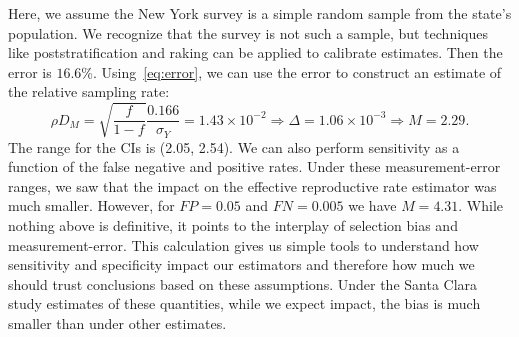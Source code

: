 \documentclass[aoas]{amsart}
\begin{document}
Here, we assume the New York survey is a simple random sample from the state's population. We recognize that the survey is not such a sample, but techniques like poststratification and raking can be applied to calibrate estimates. Then the error is $16.6$\%.  Using~\eqref{eq:error}, we can use the error to construct an estimate of the relative sampling rate:
\[
\rho D_M = \sqrt{\frac{f}{1-f}} \frac{\text{0.166}}{\sigma_Y} = 1.43 \times 10^{-2} \Rightarrow \Delta = 1.06 \times 10^{-3} \Rightarrow M = 2.29.
\]
The range for the CIs is (2.05, 2.54).  We can also perform sensitivity as a function of the false negative and positive rates.  Under these measurement-error ranges, we saw that the impact on the effective reproductive rate estimator was much smaller.  However, for $FP = 0.05$ and $FN = 0.005$ we have $M = 4.31$.  While nothing above is definitive, it points to the interplay of selection bias and measurement-error.  This calculation gives us simple tools to understand how sensitivity and specificity impact our estimators and therefore how much we should trust conclusions based on these assumptions.  Under the Santa Clara study estimates of these quantities, while we expect impact, the bias is much smaller than under other estimates.
\end{document}
